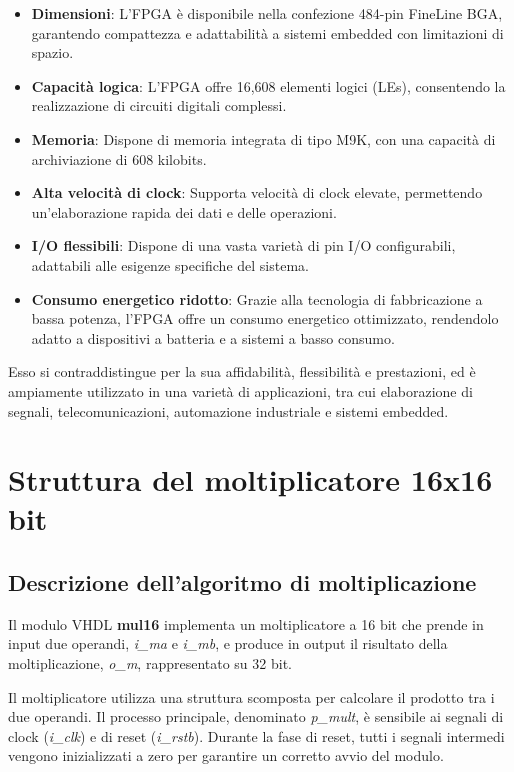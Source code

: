 \documentclass[titlepage]{report}
\begin{document}
			\begin{itemize}
				\item \textbf{Dimensioni}: L'FPGA è disponibile nella confezione 484-pin FineLine BGA, garantendo compattezza e adattabilità a sistemi embedded con limitazioni di spazio.
				\item \textbf{Capacità logica}: L'FPGA offre 16,608 elementi logici (LEs), consentendo la realizzazione di circuiti digitali complessi.
				\item \textbf{Memoria}: Dispone di memoria integrata di tipo M9K, con una capacità di archiviazione di 608 kilobits.
				\item \textbf{Alta velocità di clock}: Supporta velocità di clock elevate, permettendo un'elaborazione rapida dei dati e delle operazioni.
				\item \textbf{I/O flessibili}: Dispone di una vasta varietà di pin I/O configurabili, adattabili alle esigenze specifiche del sistema.
				\item \textbf{Consumo energetico ridotto}: Grazie alla tecnologia di fabbricazione a bassa potenza, l'FPGA offre un consumo energetico ottimizzato, rendendolo adatto a dispositivi a batteria e a sistemi a basso consumo.
			\end{itemize}
			
			Esso si contraddistingue per la sua affidabilità, flessibilità e prestazioni, ed è ampiamente utilizzato in una varietà di applicazioni, tra cui elaborazione di segnali, telecomunicazioni, automazione industriale e sistemi embedded.
	
\chapter{Struttura del moltiplicatore 16x16 bit}
\label{ch:struttura_moltiplicatore}

	\section{Descrizione dell'algoritmo di moltiplicazione}
	\label{sec:algoritmo_moltiplicazione}
		Il modulo VHDL \textbf{mul16} implementa un moltiplicatore a 16 bit che prende in input due operandi, \textit{i\_ma} e \textit{i\_mb}, e produce in output il risultato della moltiplicazione, \textit{o\_m}, rappresentato su 32 bit.

		Il moltiplicatore utilizza una struttura scomposta per calcolare il prodotto tra i due operandi. Il processo principale, denominato \textit{p\_mult}, è sensibile ai segnali di clock (\textit{i\_clk}) e di reset (\textit{i\_rstb}). Durante la fase di reset, tutti i segnali intermedi vengono inizializzati a zero per garantire un corretto avvio del modulo.
		
\end{document}
